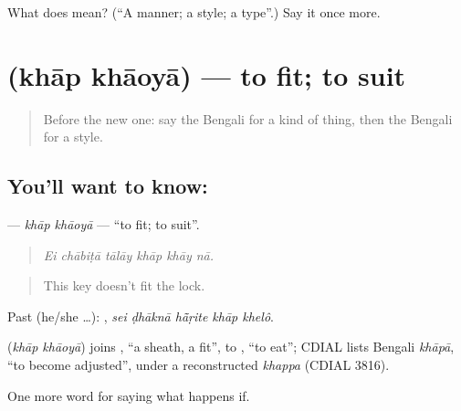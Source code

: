 \begin{tcolorbox}[breakable,colback=teal!4,colframe=teal!35!black,title={Before you move on}]
What does  mean? (\textquotedblleft{}A manner; a style; a type\textquotedblright{}.) Say it once more.
\end{tcolorbox}
\section[\texorpdfstring{\bn{খাপ} \bn{খাওয়া} (khāp khāoyā)}{খাপ খাওয়া (khāp khāoyā)}]{  (khāp khāoyā) — to fit; to suit}

\label{lesson:BN-C536-khap-khaoya}



\begin{quote}
Before the new one: say the Bengali for a kind of thing, then the Bengali for a style.
\end{quote}

\subsection*{You'll want to know:  }
\textbf{ } — \emph{khāp khāoyā} — \textquotedblleft{}to fit; to suit\textquotedblright{}.

\begin{quote}
     
\end{quote}

\begin{quote}
\emph{Ei chābiṭā tālāy khāp khāy nā.}
\end{quote}

\begin{quote}
This key doesn't fit the lock.
\end{quote}

Past (he/she …):     , \emph{sei ḍhāknā hā̃ṛite khāp khelô}.

\begin{cousinweb}
\textbf{ } (\emph{khāp khāoyā}) joins , \textquotedblleft{}a sheath, a fit\textquotedblright{}, to , \textquotedblleft{}to eat\textquotedblright{}; CDIAL lists Bengali \emph{khāpā}, \textquotedblleft{}to become adjusted\textquotedblright{}, under a reconstructed \emph{khappa} (CDIAL 3816).
\end{cousinweb}

\begin{grammarlens}[title={What you've built}]
One more word for saying what happens if.
\end{grammarlens}

